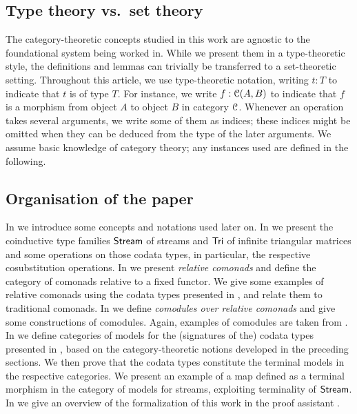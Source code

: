\documentclass[a4paper,USenglish]{lipics}
\begin{document}
 \subsection{Type theory vs.\ set theory} \label{sec:type_vs_set} The category-theoretic concepts studied in this work are agnostic to the foundational system being worked in.
 While we present them in a type-theoretic style, the definitions and lemmas can trivially be transferred to a set-theoretic setting.
 Throughout this article, we use type-theoretic notation,  writing $t:T$ to indicate that $t$ is of type $T$. 
 For instance, we write $f : {\mathcal{C}}(A,B)$ to indicate that $f$ is a morphism from object $A$ to object $B$ in category ${\mathcal{C}}$.
 Whenever an operation takes several arguments, we write some of them as indices; these indices might be omitted when 
 they can be deduced from the type of the later arguments.
 We assume basic knowledge of category theory; any instances used are defined in the following.
  
 
 
 \subsection{Organisation of the paper} \label{sec:organisation}
  In  we introduce some concepts and notations used later on.
  In  we present the coinductive type families $\mathsf{Stream}$ of streams and $\mathsf{Tri}$ of infinite triangular matrices and some operations on those codata types,
  in particular, the respective cosubstitution operations.
  In  we present \emph{relative comonads} and define the category of comonads relative to a fixed functor.
    We give some examples of relative comonads using the codata types presented in , 
    and relate them to traditional comonads.
  In  we define \emph{comodules over relative comonads} and give some constructions of comodules.
     Again, examples of comodules are taken from .
  In  we define categories of models for the (signatures of the) codata types presented in ,
      based on the category-theoretic notions developed in the preceding sections.
      We then prove that the codata types constitute the terminal models in the respective categories.
      We present an example of a map defined as a terminal morphism in the category of models for streams, exploiting terminality of $\mathsf{Stream}$.
  In  we give an overview of the formalization of this work in the proof assistant \coq.
  
\end{document}
